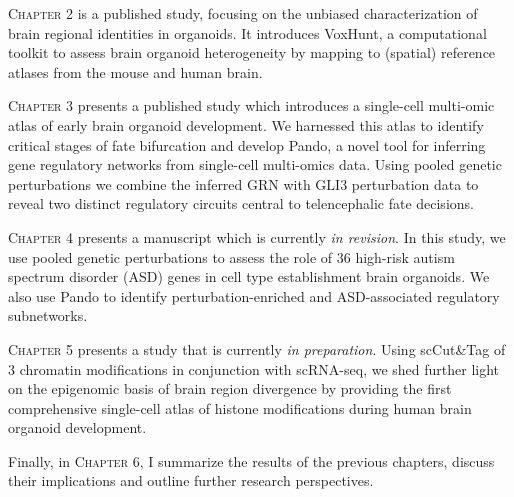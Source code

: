{\scshape Chapter 2} is a published study, focusing on the unbiased characterization of brain regional identities in organoids. It introduces VoxHunt, a computational toolkit to assess brain organoid heterogeneity by mapping to (spatial) reference atlases from the mouse and human brain.

{\scshape Chapter 3} presents a published study which introduces a single-cell multi-omic atlas of early brain organoid development. We harnessed this atlas to identify critical stages of fate bifurcation and develop Pando, a novel tool for inferring gene regulatory networks from single-cell multi-omics data. Using pooled genetic perturbations we combine the inferred GRN with GLI3 perturbation data to reveal two distinct regulatory circuits central to telencephalic fate decisions.

{\scshape Chapter 4} presents a manuscript which is currently \textit{in revision}. In this study, we use pooled genetic perturbations to assess the role of 36 high-risk autism spectrum disorder (ASD) genes in cell type  establishment brain organoids. We also use Pando to identify perturbation-enriched and ASD-associated regulatory subnetworks.

{\scshape Chapter 5} presents a study that is currently \textit{in preparation}. Using scCut\&Tag of 3 chromatin modifications in conjunction with scRNA-seq, we shed further light on the epigenomic basis of brain region divergence by providing the first comprehensive single-cell atlas of histone modifications during human brain organoid development.

Finally, in {\scshape Chapter 6}, I summarize the results of the previous chapters, discuss their implications and outline further research perspectives.
